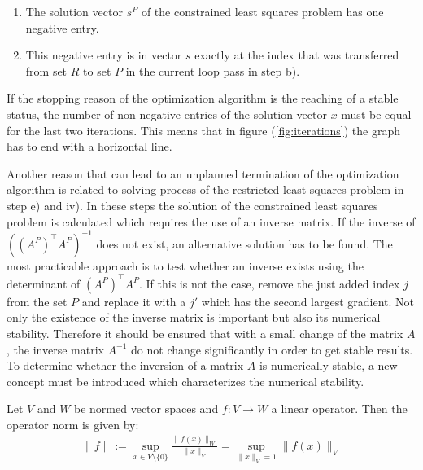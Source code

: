 \begin{enumerate}
	\item The solution vector $s^P$ of the constrained least squares problem has one negative entry.
	\item This negative entry is in vector $s$ exactly at the index that was transferred from set $R$ to set $P$ in the current loop pass in step b).
\end{enumerate}


\begin{remark}
	If the stopping reason of the optimization algorithm is the reaching of a stable status, the number of non-negative entries of the solution vector $x$ must be equal for the last two iterations. This means that in figure (\ref{fig:iterations}) the graph has to end with a horizontal line.
\end{remark}

Another reason that can lead to an unplanned termination of the optimization algorithm is related to solving process of the restricted least squares problem in step e) and iv). In these steps the solution of the constrained least squares problem is calculated which requires the use of an inverse matrix. If the inverse of $((A^P)^\top A^P)^{-1}$ does not exist, an alternative solution has to be found. The most practicable approach is to test whether an inverse exists using the determinant of $(A^P)^\top A^P$. If this is not the case, remove the just added index $j$ from the set $P$ and replace it with a $j'$ which has the second largest gradient. 
Not only the existence of the inverse matrix is important but also its numerical stability. Therefore it should be ensured that with a small change of the matrix $A$, the inverse matrix $A^{-1}$ do not change significantly in order to get stable results. To determine whether the inversion of a matrix $A$ is numerically stable, a new concept must be introduced which characterizes the numerical stability.



\begin{definition}
	Let $V$ and $W$ be normed vector spaces and $f:V \to W$ a linear operator. Then the operator norm is given by: 
	\begin{align}\label{eq:operator_Norm}
		\lVert f \rVert := \sup_{x \in V \setminus \{0\}} \frac{\lVert f(x) \rVert_W}{\lVert x \rVert_V} = \sup_{\lVert x \rVert_{V} = 1} \lVert f(x) \rVert_V
	\end{align}
\end{definition}

